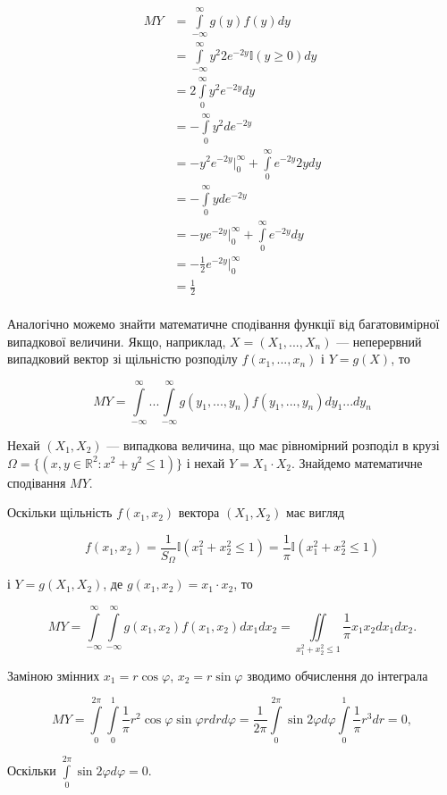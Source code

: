 $$\begin{array}{rl}
    MY & = \int\limits_{-\infty}^{\infty} g(y) f(y) dy \\
    & = \int\limits_{-\infty}^{\infty} y^2 2e^{-2y} \mathbb{I}(y \geqslant 0) dy \\
    & = 2 \int\limits_{0}^{\infty} y^2 e^{-2y} dy \\
    & = -\int\limits_{0}^{\infty} y^2 de^{-2y} \\
    & = - y^2 e^{-2y} \Big|_{0}^{\infty} + \int\limits_{0}^{\infty} e^{-2y} 2y dy \\
    & = - \int\limits_{0}^{\infty} y de^{-2y} \\
    & = - y e^{-2y} \Big|_{0}^{\infty} + \int\limits_{0}^{\infty} e^{-2y} dy \\
    & = - \frac{1}{2} e^{-2y} \Big|_{0}^{\infty} \\
    & = \frac{1}{2} \\
\end{array}$$

Аналогічно можемо знайти математичне сподівання функції від багатовимірної
випадкової величини. Якщо, наприклад, $X = (X_1, ..., X_n)$ --- неперервний
випадковий вектор зі щільністю розподілу $f(x_1, ..., x_n)$ і $Y = g(X)$, то

\begin{equation}
    MY = \int\limits_{-\infty}^{\infty} ... \int\limits_{-\infty}^{\infty}
        g(y_1, ..., y_n) f(y_1, ..., y_n) dy_1...dy_n
\end{equation}

\begin{example}
    Нехай $(X_1, X_2)$ --- випадкова величина,
    що має рівномірний розподіл в крузі
    $\Omega = \{(x, y \in \mathbb{R}^2: x^2 + y^2 \leqslant 1)\}$
    і нехай $Y = X_1 \cdot X_2$.
    Знайдемо математичне сподівання $MY$.
    
    Оскільки щільність $f(x_1, x_2)$ вектора $(X_1, X_2)$ 
    має вигляд 
    
    $$f(x_1, x_2)
    = \frac{1}{S_{\Omega}} \mathbb{I}(x_1^2 + x_2^2 \leqslant 1)
    = \frac{1}{\pi} \mathbb{I}(x_1^2 + x_2^2 \leqslant 1)$$
    
    і $Y = g(X_1, X_2)$, де $g(x_1, x_2) = x_1 \cdot x_2$, то
    
    $$MY
    = \int\limits_{-\infty}^{\infty} \int\limits_{-\infty}^{\infty} g(x_1, x_2) f(x_1, x_2) dx_1 dx_2
    = \iint\limits_{x_1^2  + x_2^2 \leqslant 1} \frac{1}{\pi} x_1 x_2 dx_1 dx_2.$$
    
    Заміною змінних $x_1 = r \cos \varphi$, $x_2 = r \sin \varphi$
    зводимо обчислення до інтеграла
    
    $$MY
    = \int\limits_{0}^{2 \pi} \int\limits_{0}^{1} \frac{1}{\pi} r^2 \cos \varphi \sin \varphi r dr d\varphi 
    = \dfrac{1}{2\pi} \int\limits_{0}^{2 \pi} \sin 2\varphi d\varphi \int\limits_{0}^{1} \frac{1}{\pi} r^3 dr
    = 0,$$
    
    Оскільки $\int\limits_{0}^{2 \pi} \sin 2\varphi d\varphi = 0$.
\end{example}

